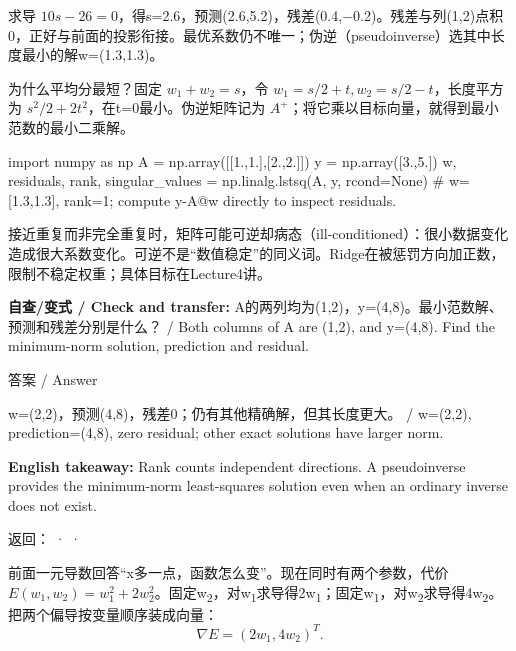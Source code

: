 求导 \(10s-26=0\)，得s=2.6，预测(2.6,5.2)，残差(0.4,\ensuremath{-}0.2)。残差与列(1,2)点积0，正好与前面的投影衔接。最优系数仍不唯一；伪逆（pseudoinverse）选其中长度最小的解w=(1.3,1.3)。


为什么平均分最短？固定 \(w_1+w_2=s\)，令 \(w_1=s/2+t,w_2=s/2-t\)，长度平方为 \(s^2/2+2t^2\)，在t=0最小。伪逆矩阵记为 \(A^+\)；将它乘以目标向量，就得到最小范数的最小二乘解。



\begin{StudyCode}
import numpy as np
A = np.array([[1.,1.],[2.,2.]])
y = np.array([3.,5.])
w, residuals, rank, singular_values = np.linalg.lstsq(A, y, rcond=None)
# w=[1.3,1.3], rank=1; compute y-A@w directly to inspect residuals.
\end{StudyCode}


接近重复而非完全重复时，矩阵可能可逆却病态（ill-conditioned）：很小数据变化造成很大系数变化。可逆不是“数值稳定”的同义词。Ridge在被惩罚方向加正数，限制不稳定权重；具体目标在Lecture4讲。


\textbf{自查/变式 / Check and transfer:} A的两列均为(1,2)，y=(4,8)。最小范数解、预测和残差分别是什么？ / Both columns of A are (1,2), and y=(4,8). Find the minimum-norm solution, prediction and residual.



\begin{StudySolution}{答案 / Answer}


w=(2,2)，预测(4,8)，残差0；仍有其他精确解，但其长度更大。 / w=(2,2), prediction=(4,8), zero residual; other exact solutions have larger norm.


\end{StudySolution}


\textbf{English takeaway:} Rank counts independent directions. A pseudoinverse provides the minimum-norm least-squares solution even when an ordinary inverse does not exist.


返回： ·  · 








前面一元导数回答“x多一点，函数怎么变”。现在同时有两个参数，代价 \(E(w_1,w_2)=w_1^2+2w_2^2\)。固定w\textsubscript{2}，对w\textsubscript{1}求导得2w\textsubscript{1}；固定w\textsubscript{1}，对w\textsubscript{2}求导得4w\textsubscript{2}。把两个偏导按变量顺序装成向量：
\[
\nabla E=(2w_1,4w_2)^T.\tag{M.37}
\]


